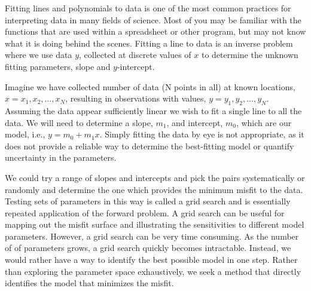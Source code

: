 Fitting lines and polynomials to data is one of the most common practices for interpreting data in many fields of science.  Most of you may be familiar with the functions that are used within a spreadsheet or other program, but may not know what it is doing behind the scenes.  Fitting a line to data is an inverse problem where we use data $y$, collected at discrete values of $x$ to determine the unknown fitting parameters, slope and $y$-intercept.

Imagine we have collected number of data (N points in all) at known locations, $x = x_1,x_2,\ldots,x_N$, resulting in observations with values, $y = y_1,y_2,\ldots,y_N$.  Assuming the data appear sufficiently linear we wish to fit a single line to all the data.  We will need to determine a slope, $m_1$, and intercept, $m_0$, which are our model, i.e., $y = m_0 + m_1 x$.  Simply fitting the data by eye is not appropriate, as it does not provide a reliable way to determine the best-fitting model or quantify uncertainty in the parameters.

We could try a range of slopes and intercepts and pick the pairs systematically or randomly and determine the one which provides the minimum misfit to the data.  Testing sets of parameters in this way is called a grid search and is essentially repeated application of the forward problem.  A grid search can be useful for mapping out the misfit surface and illustrating the sensitivities to different model parameters.  However, a grid search can be very time consuming.  As the number of of parameters grows, a grid search quickly becomes intractable.  Instead, we would rather have a way to identify the best possible model in one step.  Rather than exploring the parameter space exhaustively, we seek a method that directly identifies the model that minimizes the misfit.

